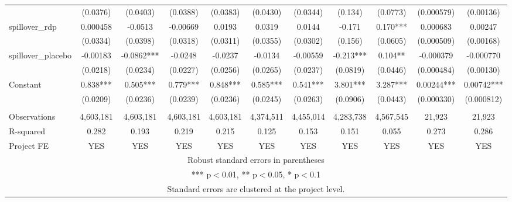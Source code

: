 \begin{tabular}{lcccccccccc}
 & (0.0376) & (0.0403) & (0.0388) & (0.0383) & (0.0430) & (0.0344) & (0.134) & (0.0773) & (0.000579) & (0.00136) \\
spillover\_rdp & 0.000458 & -0.0513 & -0.00669 & 0.0193 & 0.0319 & 0.0144 & -0.171 & 0.170*** & 0.000683 & 0.00247 \\
 & (0.0334) & (0.0398) & (0.0318) & (0.0311) & (0.0355) & (0.0302) & (0.156) & (0.0605) & (0.000509) & (0.00168) \\
spillover\_placebo & -0.00183 & -0.0862*** & -0.0248 & -0.0237 & -0.0134 & -0.00559 & -0.213*** & 0.104** & -0.000379 & -0.000770 \\
 & (0.0218) & (0.0234) & (0.0227) & (0.0256) & (0.0265) & (0.0237) & (0.0819) & (0.0446) & (0.000484) & (0.00130) \\
Constant & 0.838*** & 0.505*** & 0.779*** & 0.848*** & 0.585*** & 0.541*** & 3.801*** & 3.287*** & 0.00244*** & 0.00742*** \\
 & (0.0209) & (0.0236) & (0.0239) & (0.0236) & (0.0245) & (0.0263) & (0.0906) & (0.0443) & (0.000330) & (0.000812) \\
 &  &  &  &  &  &  &  &  &  &  \\
Observations & 4,603,181 & 4,603,181 & 4,603,181 & 4,603,181 & 4,374,511 & 4,455,014 & 4,283,738 & 4,567,545 & 21,923 & 21,923 \\
R-squared & 0.282 & 0.193 & 0.219 & 0.215 & 0.125 & 0.153 & 0.151 & 0.055 & 0.273 & 0.286 \\
 Project FE & YES & YES & YES & YES & YES & YES & YES & YES & YES & YES \\ \hline
\multicolumn{11}{c}{ Robust standard errors in parentheses} \\
\multicolumn{11}{c}{ *** p$<$0.01, ** p$<$0.05, * p$<$0.1} \\
\multicolumn{11}{c}{ Standard errors are clustered at the project level.} \\
\end{tabular}
